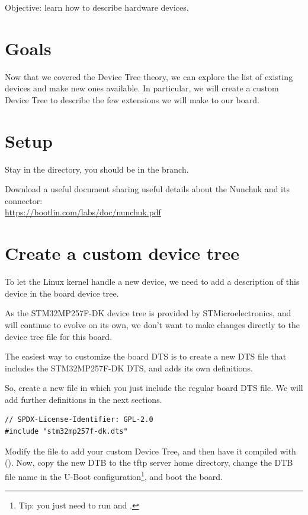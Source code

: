 {Objective: learn how to describe hardware devices.}

\section{Goals}

Now that we covered the Device Tree theory, we can explore the list of
existing devices and make new ones available. In particular, we will
create a custom Device Tree to describe the few extensions we will make
to our board.

\section{Setup}

Stay in the  directory, you should be
in the  branch.

Download a useful document sharing useful details about the Nunchuk
and its connector:\\
\url{https://bootlin.com/labs/doc/nunchuk.pdf}

\section{Create a custom device tree}

To let the Linux kernel handle a new device, we need to add a
description of this device in the board device tree.

As the STM32MP257F-DK device tree is provided by STMicroelectronics,
and will continue to evolve on its own, we don't want to make changes
directly to the device tree file for this board.

The easiest way to customize the board DTS is to create a new DTS file
that includes the STM32MP257F-DK DTS, and adds its own definitions.

So, create a new
 file in which
you just include the regular board DTS file. We will add further
definitions in the next sections.

\begin{verbatim}
// SPDX-License-Identifier: GPL-2.0
#include "stm32mp257f-dk.dts"
\end{verbatim}

Modify the  file to add your custom
Device Tree, and then have it compiled with (). Now,
copy the new DTB to the tftp server home directory, change the DTB file
name in the U-Boot configuration\footnote{Tip: you just need to run
 and .}, and boot the board.

